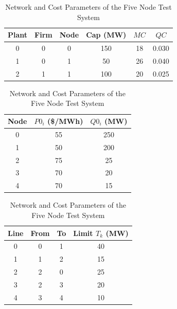 \documentclass[lettersize,journal]{IEEEtran}
\begin{document}
\begin{table}[!t]
    \centering

    \caption{Network and Cost Parameters of the Five Node Test System}
    \label{tab:params}
    \begin{minipage}{0.36\textwidth}
        \centering
        \begin{tabular}{cccccc}
        \hline
        Plant & Firm & Node & Cap (MW) & $MC$ & $QC$ \\
        \hline
        0 & 0 & 0 & 150 & 18 & 0.030 \\
        1 & 0 & 1 & 50  & 26 & 0.040 \\
        2 & 1 & 1 & 100 & 20 & 0.025 \\
        \hline
        \end{tabular}
    \end{minipage}\hfill
    \begin{minipage}{0.28\textwidth}
        \centering
        \begin{tabular}{ccc}
        \hline
        Node & $P0_i$ (\$/MWh) & $Q0_i$ (MW) \\
        \hline
        0 & 55 & 250 \\
        1 & 50 & 200 \\
        2 & 75 & 25 \\
        3 & 70 & 20 \\
        4 & 70 & 15 \\
        \hline
        \end{tabular}
    \end{minipage}\hfill
    \begin{minipage}{0.3\textwidth}
        \centering
        \begin{tabular}{cccc}
        \hline
        Line & From & To & Limit $T_k$ (MW) \\
        \hline
        0 & 0 & 1 & 40 \\
        1 & 1 & 2 & 15 \\
        2 & 2 & 0 & 25 \\
        3 & 2 & 3 & 20 \\
        4 & 3 & 4 & 10 \\
        \hline
        \end{tabular}
    \end{minipage}

    \vspace{0.6cm}


\end{table}
\end{document}

